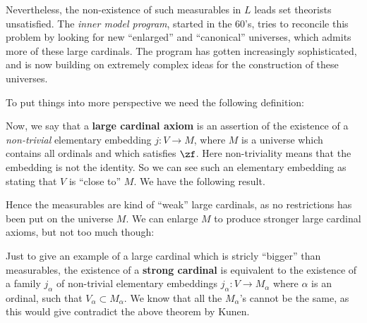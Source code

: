 \qquad Nevertheless, the non-existence of such measurables in $L$ leads set theorists unsatisfied. The \textit{inner model program}, started in the 60's, tries to reconcile this problem by looking for new ``enlarged'' and ``canonical'' universes, which admits more of these large cardinals. The program has gotten increasingly sophisticated, and is now building on extremely complex ideas for the construction of these universes.

\qquad To put things into more perspective we need the following definition:


Now, we say that a \textbf{large cardinal axiom} is an assertion of the existence of a \textit{non-trivial} elementary embedding $j:V\to M$, where $M$ is a universe which contains all ordinals and which satisfies $\zf$. Here non-triviality means that the embedding is not the identity. So we can see such an elementary embedding as stating that $V$ is ``close to'' $M$. We have the following result.


Hence the measurables are kind of ``weak'' large cardinals, as no restrictions has been put on the universe $M$. We can enlarge $M$ to produce stronger large cardinal axioms, but not too much though:


Just to give an example of a large cardinal which is stricly ``bigger'' than measurables, the existence of a \textbf{strong cardinal} is equivalent to the existence of a family $j_\alpha$ of non-trivial elementary embeddings $j_\alpha:V\to M_\alpha$ where $\alpha$ is an ordinal, such that $V_\alpha\subset M_\alpha$. We know that all the $M_\alpha$'s cannot be the same, as this would give contradict the above theorem by Kunen.


